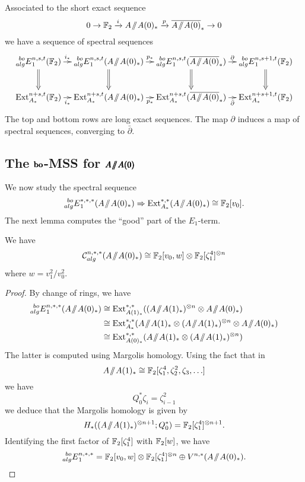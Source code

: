 \begin{lem}\label{lem:MSSSES}
Associated to the short exact sequence
$$ 0 \rightarrow \FF_2 \xrightarrow{i} {A \mmod A(0)_*} \xrightarrow{p} \AA0 \rightarrow 0 $$
we have a sequence of spectral sequences
$$ 
\xymatrix@C-1.5em{
\E{bo}{alg}_1^{n,s,t}(\FF_2) \ar[r]^-{i_*} \ar@{=>}[d] &
\E{bo}{alg}^{n,s,t}_1({A\mmod A(0)_*}) \ar[r]^-{p_*} \ar@{=>}[d] &
\E{bo}{alg}^{n,s,t}_1(\br{A\mmod A(0)}_*) \ar[r]^-{\partial} \ar@{=>}[d] &
\E{bo}{alg}^{n,s+1,t}_1(\FF_2)  \ar@{=>}[d]
\\
\Ext^{n+s, t}_{A_*}(\FF_2) \ar[r]_-{i_*} &
\Ext^{n+s, t}_{A_*}(A\mmod A(0)_*) \ar[r]_-{p_*} &
\Ext^{n+s, t}_{A_*}(\AA0) \ar[r]_-{\bar{\partial}} &
\Ext^{n+s+1, t}_{A_*}(\FF_2) 
}
$$
The top and bottom rows are long exact sequences.  The map $\partial$ induces a map of spectral sequences, converging to $\bar{\partial}$.
\end{lem}

\subsection*{The $\pmb{\mathrm{bo}}$-MSS for $\pmb{A \! \sslash \! A(0)}$}

We now study the spectral sequence
$$ \prescript{bo}{alg}{E}^{*,*,*}_1(A\! \sslash \! A(0)_*) \Rightarrow \operatorname{Ext}^{*,*}_{A_*}(A \! \sslash \! A(0)_*) \cong \mathbb{F}_2[v_0]. $$
The next lemma computes the ``good'' part of the $E_1$-term.

\begin{lem}\label{lem:AmodA0good}
We have
\[\mathcal{C}_{alg}^{n,*,*}(A \! \sslash \! A(0)_*) \cong \mathbb{F}_2[v_0, w] \otimes \mathbb{F}_2[\zeta_1^{4}]^{\otimes n}  \]
where $w = v_1^2/v_0^2$.
\end{lem}

\begin{proof}
By change of rings, we have
\begin{align*}
 \E{bo}{alg}_1^{n,*,*}(A \mmod A(0)_*) & \cong 
 \Ext^{*,*}_{A(1)_*} ((A \mmod A(1)_*)^{\otimes n} \otimes A\mmod A(0)_*) \\
 & \cong \Ext^{*,*}_{A_*} (A \mmod A(1)_* \otimes (A \mmod A(1)_*)^{\otimes n} \otimes A\mmod A(0)_*) \\
 & \cong \Ext^{*,*}_{A(0)_*} (A \mmod A(1)_* \otimes (A \mmod A(1)_*)^{\otimes n})
 \end{align*}
 The latter is computed using Margolis homology. Using the fact that in 
 \[ A\! \sslash \! A(1)_* \cong \mathbb{F}_2[\zeta_1^{4}, \zeta_2^{2}, \zeta_3, \ldots  ] \]
 we have
 \[ Q_0^* \zeta_i = \zeta^2_{i-1} \] 
 we deduce that the Margolis homology is given by
\[ H_*((A \! \sslash \! A(1)_*)^{\otimes n+1}; Q_0^*) = \mathbb{F}_2[\zeta_1^{4}]^{\otimes n+1}. \]
Identifying the first factor of $\mathbb{F}_2[\zeta^4_1]$ with $\mathbb{F}_2[w]$,
 we have
\[ \prescript{bo}{alg}{E}_1^{n, *, *} = \mathbb{F}_2[v_0, w] \otimes \mathbb{F}_2[\zeta_1^{4}]^{\otimes n} \oplus V^{n,*}(A \! \sslash \! A(0)_*). \qedhere \]
\end{proof}

